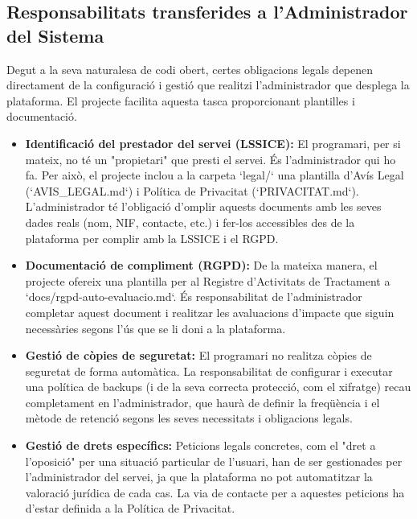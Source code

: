 \subsection{Responsabilitats transferides a l'Administrador del Sistema}

Degut a la seva naturalesa de codi obert, certes obligacions legals depenen directament de la configuració i gestió que realitzi l'administrador que desplega la plataforma. El projecte facilita aquesta tasca proporcionant plantilles i documentació.

\begin{itemize}
    \item \textbf{Identificació del prestador del servei (LSSICE):} El programari, per si mateix, no té un "propietari" que presti el servei. És l'administrador qui ho fa. Per això, el projecte inclou a la carpeta `legal/` una plantilla d'Avís Legal (`AVIS\_LEGAL.md`) i Política de Privacitat (`PRIVACITAT.md`). L'administrador té l'obligació d'omplir aquests documents amb les seves dades reals (nom, NIF, contacte, etc.) i fer-los accessibles des de la plataforma per complir amb la LSSICE i el RGPD.

    \item \textbf{Documentació de compliment (RGPD):} De la mateixa manera, el projecte ofereix una plantilla per al Registre d'Activitats de Tractament a `docs/rgpd-auto-evaluacio.md`. És responsabilitat de l'administrador completar aquest document i realitzar les avaluacions d'impacte que siguin necessàries segons l'ús que se li doni a la plataforma.

    \item \textbf{Gestió de còpies de seguretat:} El programari no realitza còpies de seguretat de forma automàtica. La responsabilitat de configurar i executar una política de backups (i de la seva correcta protecció, com el xifratge) recau completament en l'administrador, que haurà de definir la freqüència i el mètode de retenció segons les seves necessitats i obligacions legals.

    \item \textbf{Gestió de drets específics:} Peticions legals concretes, com el "dret a l'oposició" per una situació particular de l'usuari, han de ser gestionades per l'administrador del servei, ja que la plataforma no pot automatitzar la valoració jurídica de cada cas. La via de contacte per a aquestes peticions ha d'estar definida a la Política de Privacitat.
\end{itemize}

